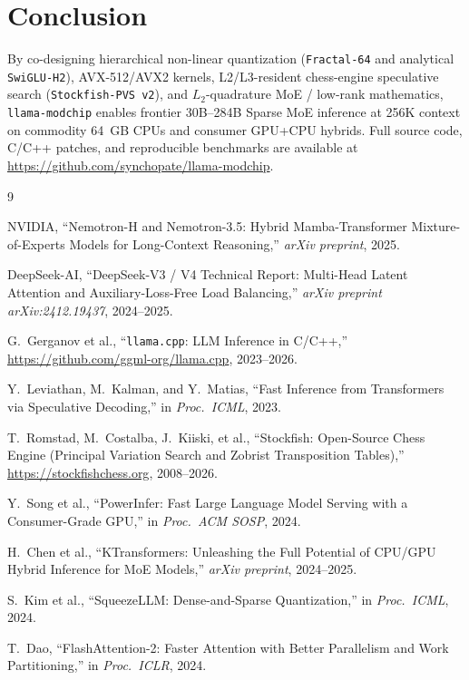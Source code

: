 \documentclass[10pt,twocolumn]{article}
\begin{document}
\section{Conclusion}
By co-designing hierarchical non-linear quantization (\texttt{Fractal-64} and analytical \texttt{SwiGLU-H2}), AVX-512/AVX2 kernels, L2/L3-resident chess-engine speculative search (\texttt{Stockfish-PVS v2}), and $L_2$-quadrature MoE / low-rank mathematics, \texttt{llama-modchip} enables frontier 30B--284B Sparse MoE inference at 256K context on commodity 64~GB CPUs and consumer GPU+CPU hybrids. Full source code, C/C++ patches, and reproducible benchmarks are available at \url{https://github.com/synchopate/llama-modchip}.

\begin{thebibliography}{9}

NVIDIA, ``Nemotron-H and Nemotron-3.5: Hybrid Mamba-Transformer Mixture-of-Experts Models for Long-Context Reasoning,'' \emph{arXiv preprint}, 2025.

DeepSeek-AI, ``DeepSeek-V3 / V4 Technical Report: Multi-Head Latent Attention and Auxiliary-Loss-Free Load Balancing,'' \emph{arXiv preprint arXiv:2412.19437}, 2024--2025.

G.~Gerganov et al., ``\texttt{llama.cpp}: LLM Inference in C/C++,'' \url{https://github.com/ggml-org/llama.cpp}, 2023--2026.

Y.~Leviathan, M.~Kalman, and Y.~Matias, ``Fast Inference from Transformers via Speculative Decoding,'' in \emph{Proc.\ ICML}, 2023.

T.~Romstad, M.~Costalba, J.~Kiiski, et al., ``Stockfish: Open-Source Chess Engine (Principal Variation Search and Zobrist Transposition Tables),'' \url{https://stockfishchess.org}, 2008--2026.

Y.~Song et al., ``PowerInfer: Fast Large Language Model Serving with a Consumer-Grade GPU,'' in \emph{Proc.\ ACM SOSP}, 2024.

H.~Chen et al., ``KTransformers: Unleashing the Full Potential of CPU/GPU Hybrid Inference for MoE Models,'' \emph{arXiv preprint}, 2024--2025.

S.~Kim et al., ``SqueezeLLM: Dense-and-Sparse Quantization,'' in \emph{Proc.\ ICML}, 2024.

T.~Dao, ``FlashAttention-2: Faster Attention with Better Parallelism and Work Partitioning,'' in \emph{Proc.\ ICLR}, 2024.

\end{thebibliography}
\end{document}
